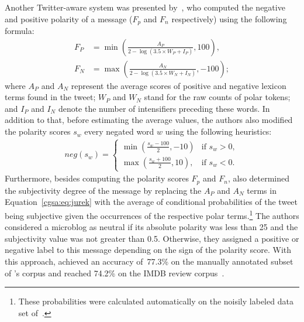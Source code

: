 Another Twitter-aware system was presented by~\citet{Jurek:15}, who
computed the negative and positive polarity of a message ($F_p$ and
$F_n$ respectively) using the following formula: { \small%
  \begin{align}
    F_P &= \min\left(\frac{A_P}{2 - \log(3.5\times W_P + I_P)}, 100\right),\\
    F_N &= \max\left(\frac{A_N}{2 - \log(3.5\times W_N + I_N)}, -100\right);\label{cgsa:eq:jurek}
  \end{align}%
  \normalsize%
}%
where $A_P$ and $A_N$ represent the average scores of positive and
negative lexicon terms found in the tweet; $W_P$ and $W_N$ stand for
the raw counts of polar tokens; and $I_P$ and $I_N$ denote the number
of intensifiers preceding these words.  In addition to that, before
estimating the average values, the authors also modified the polarity
scores $s_w$ every negated word $w$ using the following heuristics: {
  \small%
  \begin{align}
neg(s_w) =
    \begin{cases}
        \min\left(\frac{s_w - 100}{2}, -10\right) & \text{if } s_w > 0,\\
        \max\left(\frac{s_w + 100}{2}, 10\right), & \text{if } s_w < 0.
    \end{cases}
\end{align}%
\normalsize%
}%
Furthermore, besides computing the polarity scores $F_p$ and $F_n$,
\citeauthor{Jurek:15} also determined the subjectivity degree of the
message by replacing the $A_P$ and $A_N$ terms in
Equation~\ref{cgsa:eq:jurek} with the average of conditional
probabilities of the tweet being subjective given the occurrences of
the respective polar terms.\footnote{These probabilities were
  calculated automatically on the noisily labeled data set
  of~\citet{Go:09}.}  The authors considered a microblog as neutral if
its absolute polarity was less than 25 and the subjectivity value was
not greater than 0.5.  Otherwise, they assigned a positive or negative
label to this message depending on the sign of the polarity score.
With this approach, \citeauthor{Jurek:15} achieved an accuracy
of~77.3\% on the manually annotated subset of \citeauthor{Go:09}'s
corpus and reached 74.2\% on the IMDB review corpus~\cite{Maas:11}.

